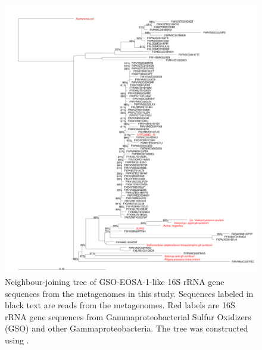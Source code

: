 \begin{figure}[!ht]
  \centering
  \includegraphics[width=\textwidth]{../polarfront/GSO-EOSA-1tree.png}
  \caption[Tree of GSO-EOSA-1 related 16S rRNA genes]{
  Neighbour-joining tree of GSO-EOSA-1-like 16S rRNA gene sequences from the metagenomes in this study.
  Sequences labeled in black text are reads from the metagenomes.
  Red labels are 16S rRNA gene sequences from Gammaproteobacterial Sulfur Oxidizers (GSO) and other Gammaproteobacteria.
  The tree was constructed using  \cite{Ludwig:2004dg}.
  }
  \label{fig:GSO-EOSA-1tree}
\end{figure}
